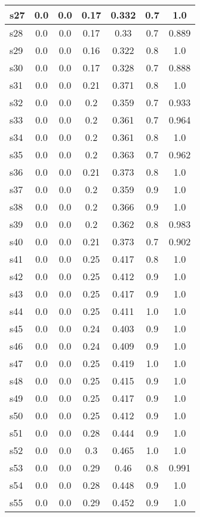 \documentclass{article}
\begin{document}
\begin{tabular}{|l|c|c|c|c|c|c|}
\hline
s27 &0.0 & 0.0 & 0.17 & 0.332 & 0.7 & 1.0\\
\hline
s28 &0.0 & 0.0 & 0.17 & 0.33 & 0.7 & 0.889\\
\hline
s29 &0.0 & 0.0 & 0.16 & 0.322 & 0.8 & 1.0\\
\hline
s30 &0.0 & 0.0 & 0.17 & 0.328 & 0.7 & 0.888\\
\hline
s31 &0.0 & 0.0 & 0.21 & 0.371 & 0.8 & 1.0\\
\hline
s32 &0.0 & 0.0 & 0.2 & 0.359 & 0.7 & 0.933\\
\hline
s33 &0.0 & 0.0 & 0.2 & 0.361 & 0.7 & 0.964\\
\hline
s34 &0.0 & 0.0 & 0.2 & 0.361 & 0.8 & 1.0\\
\hline
s35 &0.0 & 0.0 & 0.2 & 0.363 & 0.7 & 0.962\\
\hline
s36 &0.0 & 0.0 & 0.21 & 0.373 & 0.8 & 1.0\\
\hline
s37 &0.0 & 0.0 & 0.2 & 0.359 & 0.9 & 1.0\\
\hline
s38 &0.0 & 0.0 & 0.2 & 0.366 & 0.9 & 1.0\\
\hline
s39 &0.0 & 0.0 & 0.2 & 0.362 & 0.8 & 0.983\\
\hline
s40 &0.0 & 0.0 & 0.21 & 0.373 & 0.7 & 0.902\\
\hline
s41 &0.0 & 0.0 & 0.25 & 0.417 & 0.8 & 1.0\\
\hline
s42 &0.0 & 0.0 & 0.25 & 0.412 & 0.9 & 1.0\\
\hline
s43 &0.0 & 0.0 & 0.25 & 0.417 & 0.9 & 1.0\\
\hline
s44 &0.0 & 0.0 & 0.25 & 0.411 & 1.0 & 1.0\\
\hline
s45 &0.0 & 0.0 & 0.24 & 0.403 & 0.9 & 1.0\\
\hline
s46 &0.0 & 0.0 & 0.24 & 0.409 & 0.9 & 1.0\\
\hline
s47 &0.0 & 0.0 & 0.25 & 0.419 & 1.0 & 1.0\\
\hline
s48 &0.0 & 0.0 & 0.25 & 0.415 & 0.9 & 1.0\\
\hline
s49 &0.0 & 0.0 & 0.25 & 0.417 & 0.9 & 1.0\\
\hline
s50 &0.0 & 0.0 & 0.25 & 0.412 & 0.9 & 1.0\\
\hline
s51 &0.0 & 0.0 & 0.28 & 0.444 & 0.9 & 1.0\\
\hline
s52 &0.0 & 0.0 & 0.3 & 0.465 & 1.0 & 1.0\\
\hline
s53 &0.0 & 0.0 & 0.29 & 0.46 & 0.8 & 0.991\\
\hline
s54 &0.0 & 0.0 & 0.28 & 0.448 & 0.9 & 1.0\\
\hline
s55 &0.0 & 0.0 & 0.29 & 0.452 & 0.9 & 1.0\\

\end{tabular}
\end{document}
